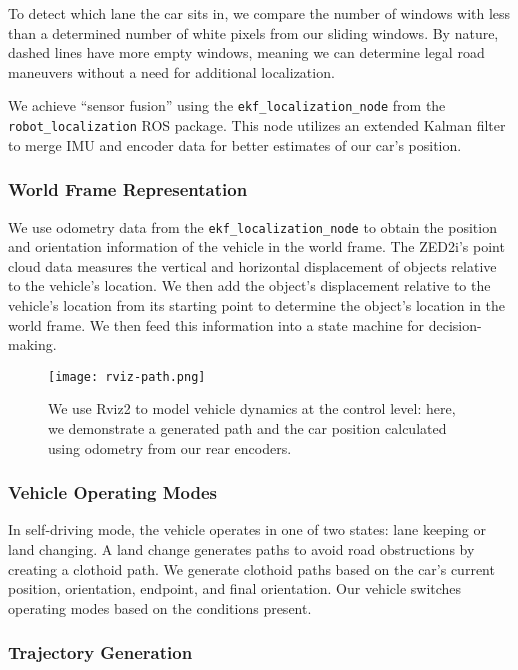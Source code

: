 To detect which lane the car sits in, we compare the number of windows
with less than a determined number of white pixels from our sliding
windows. By nature, dashed lines have more empty windows, meaning we
can determine legal road maneuvers without a need for additional
localization.

We achieve \enquote{sensor fusion} using the
\texttt{ekf\_localization\_node} from the \texttt{robot\_localization}
ROS package. This node utilizes an extended Kalman filter to merge IMU
and encoder data for better estimates of our car's position.

\subsubsection{World Frame Representation}

We use odometry data from the \texttt{ekf\_localization\_node} to
obtain the position and orientation information of the vehicle in the
world frame. The ZED2i's point cloud data measures the vertical and
horizontal displacement of objects relative to the vehicle's location.
We then add the object's displacement relative to the vehicle's
location from its starting point to determine the object's location in
the world frame. We then feed this information into a state machine for
decision-making.

\begin{figure}[ht!]
  \centering
  \texttt{[image: rviz-path.png]}
  \caption{
    We use Rviz2 to model vehicle dynamics at the control level: here,
    we demonstrate a generated path and the car position calculated
    using odometry from our rear encoders.
  }
\end{figure}

\subsubsection{Vehicle Operating Modes}

In self-driving mode, the vehicle operates in one of two states: lane
keeping or land changing. A land change generates paths to avoid road
obstructions by creating a clothoid path. We generate clothoid paths
based on the car's current position, orientation, endpoint, and final
orientation. Our vehicle switches operating modes based on the
conditions present.

\subsubsection{Trajectory Generation}

